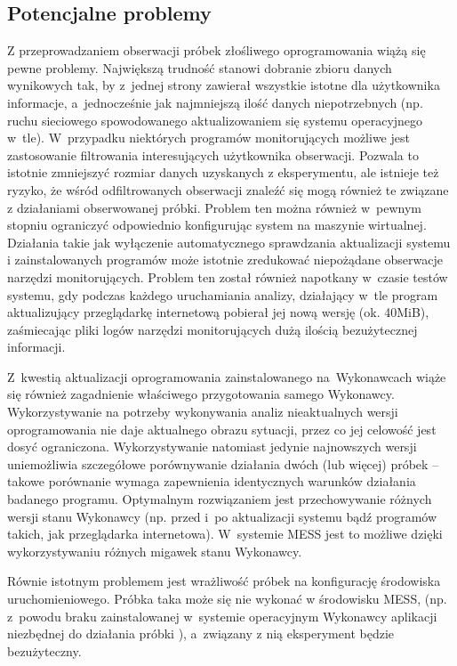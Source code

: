 \documentclass[a4paper,12pt,oneside]{article}
\begin{document}
	\subsection{Potencjalne problemy}
	Z przeprowadzaniem obserwacji próbek złośliwego oprogramowania wiążą się pewne problemy. Największą trudność stanowi dobranie zbioru danych wynikowych tak, by z~jednej strony zawierał wszystkie istotne dla użytkownika informacje, a~jednocześnie jak najmniejszą ilość danych niepotrzebnych (np. ruchu sieciowego spowodowanego aktualizowaniem się systemu operacyjnego w~tle). W~przypadku niektórych programów monitorujących możliwe jest zastosowanie filtrowania interesujących użytkownika obserwacji. Pozwala to istotnie zmniejszyć rozmiar danych uzyskanych z eksperymentu, ale istnieje też ryzyko, że wśród odfiltrowanych obserwacji znaleźć się mogą również te związane z działaniami obserwowanej próbki. Problem ten można również w~pewnym stopniu ograniczyć odpowiednio konfigurując system na maszynie wirtualnej. Działania takie jak wyłączenie automatycznego sprawdzania aktualizacji systemu i zainstalowanych programów może istotnie zredukować niepożądane obserwacje narzędzi monitorujących. Problem ten został również napotkany w~czasie testów systemu, gdy podczas każdego uruchamiania analizy, działający w~tle program aktualizujący przeglądarkę internetową pobierał jej nową wersję (ok. 40MiB), zaśmiecając pliki logów narzędzi monitorujących dużą ilością bezużytecznej informacji.
	
	Z~kwestią aktualizacji oprogramowania zainstalowanego na~Wykonawcach wiąże się również zagadnienie właściwego przygotowania samego Wykonawcy. Wykorzystywanie na potrzeby wykonywania analiz nieaktualnych wersji oprogramowania nie daje aktualnego obrazu sytuacji, przez co jej celowość jest dosyć ograniczona. Wykorzystywanie natomiast jedynie najnowszych wersji uniemożliwia szczegółowe porównywanie działania dwóch (lub więcej) próbek -- takowe porównanie wymaga zapewnienia identycznych warunków działania badanego programu. Optymalnym rozwiązaniem jest przechowywanie różnych wersji stanu Wykonawcy (np. przed i~po aktualizacji systemu bądź programów takich, jak przeglądarka internetowa). W~systemie MESS jest to możliwe dzięki wykorzystywaniu różnych migawek stanu Wykonawcy.
	
	Równie istotnym problemem jest wrażliwość próbek na konfigurację środowiska uruchomieniowego. Próbka taka może się nie wykonać w środowisku MESS, (np. z~powodu braku zainstalowanej w~systemie operacyjnym Wykonawcy aplikacji niezbędnej do działania próbki \cite{for-antivm-antidbg}), a~związany z nią eksperyment będzie bezużyteczny. 
		
\end{document}
